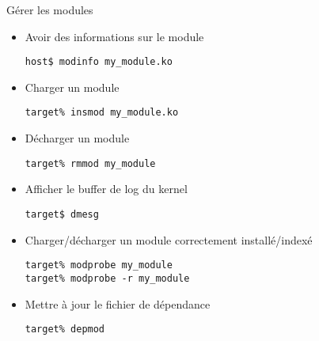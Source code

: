 \begin{frame}[fragile=singleslide]{Gérer les modules}
  \begin{itemize} 
  \item Avoir des informations sur le module
    \begin{lstlisting}
host$ modinfo my_module.ko
    \end{lstlisting} %
  \item Charger un module
    \begin{lstlisting}
target% insmod my_module.ko
    \end{lstlisting} %
  \item Décharger un module
    \begin{lstlisting}
target% rmmod my_module
    \end{lstlisting}%
  \item Afficher le buffer de log du kernel
    \begin{lstlisting}
target$ dmesg
    \end{lstlisting} %
  \item Charger/décharger un module correctement installé/indexé
    \begin{lstlisting}
target% modprobe my_module
target% modprobe -r my_module
    \end{lstlisting} %
  \item Mettre à jour le fichier de dépendance
    \begin{lstlisting} 
target% depmod
    \end{lstlisting} %
  \end{itemize}
\end{frame}


